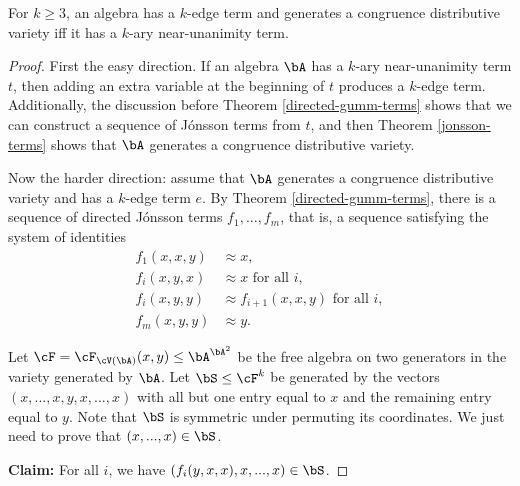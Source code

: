 \begin{thm}\label{cd-few-subpowers-nu} For $k \ge 3$, an algebra has a $k$-edge term and generates a congruence distributive variety iff it has a $k$-ary near-unanimity term.
\end{thm}
\begin{proof} First the easy direction. If an algebra $\bA$ has a $k$-ary near-unanimity term $t$, then adding an extra variable at the beginning of $t$ produces a $k$-edge term. Additionally, the discussion before Theorem \ref{directed-gumm-terms} shows that we can construct a sequence of J\'onsson terms from $t$, and then Theorem \ref{jonsson-terms} shows that $\bA$ generates a congruence distributive variety.

Now the harder direction: assume that $\bA$ generates a congruence distributive variety and has a $k$-edge term $e$. By Theorem \ref{directed-gumm-terms}, there is a sequence of directed J\'onsson terms $f_1, ..., f_m$, that is, a sequence satisfying the system of identities
\begin{align*}
f_1(x,x,y) &\approx x,\\
f_i(x,y,x) &\approx x\text{ for all }i,\\
f_i(x,y,y) &\approx f_{i+1}(x,x,y)\text{ for all }i,\\
f_m(x,y,y) &\approx y.
\end{align*}

Let $\cF = \cF_{\cV(\bA)}(x,y) \le \bA^{\bA^2}$ be the free algebra on two generators in the variety generated by $\bA$. Let $\bS \le \cF^k$ be generated by the vectors $(x,...,x,y,x,...,x)$ with all but one entry equal to $x$ and the remaining entry equal to $y$. Note that $\bS$ is symmetric under permuting its coordinates. We just need to prove that $(x,...,x) \in \bS$.

{\bf Claim:} For all $i$, we have $(f_i(y,x,x),x,...,x) \in \bS$.


\end{proof}
